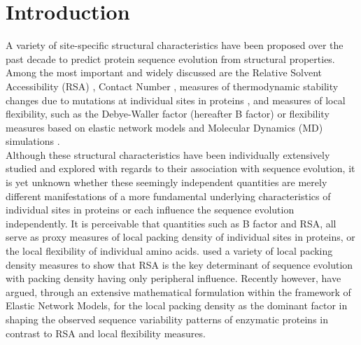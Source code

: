 \documentclass[11pt]{article}
\begin{document}
\def\thefootnote{\fnsymbol{footnote}}
\setcounter{footnote}{0}
%

\section{Introduction}
\label{sec:intro}

    A variety of site-specific structural characteristics have been proposed over the past decade to predict protein sequence evolution from structural properties. Among the most important and widely discussed are the Relative Solvent Accessibility (RSA) \citep[e.g.,][]{goldman_assessing_1998, bustamante_solvent_2000, conant_solvent_2009, franzosa_structural_2009, ramsey_relationship_2011, scherrer_modeling_2012, meyer_integrating_2013, meyer_cross-species_2013, yeh_local_2014, yeh_site-specific_2014, shahmoradi_predicting_2014, sikosek_biophysics_2014, meyer_geometric_2015}, Contact Number \citep[e.g.,][]{rodionov_sequence_1998, hamelryck_amino_2005, liao_protein_2005, bloom_structural_2006, huang_mechanistic_2014, marcos_too_2015, yeh_site-specific_2014, yeh_local_2014, shahmoradi_predicting_2014, meyer_geometric_2015}, measures of thermodynamic stability changes due to mutations at individual sites in proteins \citep[e.g.,][]{wilke_predicting_2005, echave_relationship_2014}, and measures of local flexibility, such as the Debye-Waller factor (hereafter B factor) \citep[e.g.,][]{liao_protein_2005, shih_evolutionary_2012, shahmoradi_predicting_2014} or flexibility measures based on elastic network models \citep[e.g.,][]{liu_sequence_2012} and Molecular Dynamics (MD) simulations \citep[e.g.,][]{shahmoradi_predicting_2014}. \\

    Although these structural characteristics have been individually extensively studied and explored with regards to their association with sequence evolution, it is yet unknown whether these seemingly independent quantities are merely different manifestations of a more fundamental underlying characteristics of individual sites in proteins or each influence the sequence evolution independently. It is perceivable that quantities such as B factor and RSA, all serve as proxy measures of local packing density of individual sites in proteins, or the local flexibility of individual amino acids. \citet{franzosa_structural_2009} used a variety of local packing density measures to show that RSA is the key determinant of sequence evolution with packing density having only peripheral influence. Recently however, \citet{huang_mechanistic_2014} have argued, through an extensive mathematical formulation within the framework of Elastic Network Models, for the local packing density as the dominant factor in shaping the observed sequence variability patterns of enzymatic proteins in contrast to RSA and local flexibility measures. \\
\end{document}
